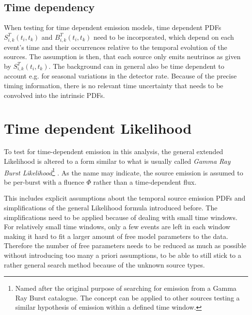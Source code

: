 \subsection{Time dependency}
When testing for time dependent emission models, time dependent PDFs $S_{i,k}^T(t_i, t_k)$ and $B_{i,k}^T(t_i, t_k)$ need to be incorporated, which depend on each event's time and their occurrences relative to the temporal evolution of the sources.
The assumption is then, that each source only emits neutrinos as given by $S_{i,k}^T(t_i, t_k)$.
The background can in general also be time dependent to account e.g. for seasonal variations in the detector rate.
Because of the precise timing information, there is no relevant time uncertainty that needs to be convolved into the intrinsic PDFs.


\section{Time dependent Likelihood}
To test for time-dependent emission in this analysis, the general extended Likelihood is altered to a form similar to what is usually called \emph{Gamma Ray Burst Likelihood}\footnote{Named after the original purpose of searching for emission from a Gamma Ray Burst catalogue. The concept can be applied to other sources testing a similar hypothesis of emission within a defined time window.} .
As the name may indicate, the source emission is assumed to be per-burst with a fluence $\Phi$ rather than a time-dependent flux.

This includes explicit assumptions about the temporal source emission PDFs and simplifications of the general Likelihood formula introduced before.
The simplifications need to be applied because of dealing with small time windows.
For relatively small time windows, only a few events are left in each window making it hard to fit a larger amount of free model parameters to the data.
Therefore the number of free parameters needs to be reduced as much as possible without introducing too many a priori assumptions, to be able to still stick to a rather general search method because of the unknown source types.

